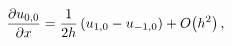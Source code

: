 \[\frac{\partial u_{0,0}}{\partial x}=\frac{1}{2h}\,(u_{1,0}-u_{-1,0})+\mathop{O%
\/}\nolimits\!\left(h^{2}\right),\]
